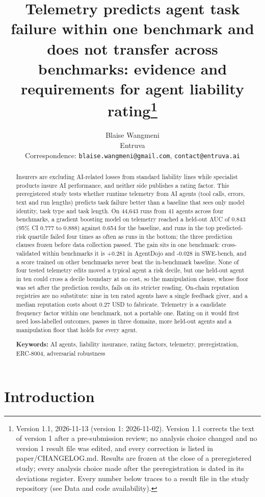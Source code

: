 \documentclass[
  11pt,
  a4paper,
]{article}
\title{Telemetry predicts agent task failure within one benchmark and
does not transfer across benchmarks: evidence and requirements for agent
liability rating\thanks{Version 1.1, 2026-11-13 (version 1: 2026-11-02).
Version 1.1 corrects the text of version 1 after a pre-submission
review; no analysis choice changed and no version 1 result file was
edited, and every correction is listed in paper/CHANGELOG.md. Results
are frozen at the close of a preregistered study; every analysis choice
made after the preregistration is dated in its deviations register.
Every number below traces to a result file in the study repository (see
Data and code availability).}}
\author{Blaise Wangmeni\\
Entruva\\
Correspondence: \texttt{blaise.wangmeni@gmail.com},
\texttt{contact@entruva.ai}}
\date{}
\begin{document}
\maketitle
\begin{abstract}
Insurers are excluding AI-related losses from standard liability lines
while specialist products insure AI performance, and neither side
publishes a rating factor. This preregistered study tests whether
runtime telemetry from AI agents (tool calls, errors, text and run
lengths) predicts task failure better than a baseline that sees only
model identity, task type and task length. On 44,643 runs from 41 agents
across four benchmarks, a gradient boosting model on telemetry reached a
held-out AUC of 0.843 (95\% CI 0.777 to 0.888) against 0.654 for the
baseline, and runs in the top predicted-risk quartile failed four times
as often as runs in the bottom; the three prediction clauses frozen
before data collection passed. The gain sits in one benchmark:
cross-validated within benchmarks it is +0.281 in AgentDojo and -0.028
in SWE-bench, and a score trained on other benchmarks never beat the
in-benchmark baseline. None of four tested telemetry edits moved a
typical agent a risk decile, but one held-out agent in ten could cross a
decile boundary at no cost, so the manipulation clause, whose floor was
set after the prediction results, fails on its stricter reading.
On-chain reputation registries are no substitute: nine in ten rated
agents have a single feedback giver, and a median reputation costs about
0.27 USD to fabricate. Telemetry is a candidate frequency factor within
one benchmark, not a portable one. Rating on it would first need
loss-labelled outcomes, passes in three domains, more held-out agents
and a manipulation floor that holds for every agent.

\medskip\noindent\textbf{Keywords:} AI agents, liability insurance,
rating factors, telemetry, preregistration, ERC-8004, adversarial
robustness
\end{abstract}

\hypertarget{introduction}{%
\section{Introduction}\label{introduction}}
\end{document}
